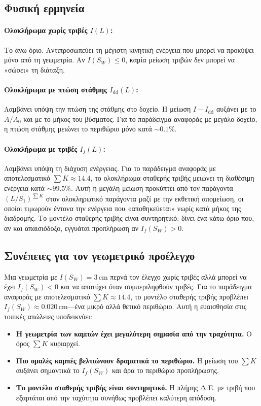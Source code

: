 \documentclass[11pt]{article}
\begin{document}
\subsection{Φυσική ερμηνεία}

\paragraph{Ολοκλήρωμα χωρίς τριβές $I(L)$:} Το άνω όριο. Αντιπροσωπεύει τη μέγιστη κινητική ενέργεια που μπορεί να προκύψει μόνο από τη γεωμετρία. Αν $I(S_W) \leq 0$, καμία μείωση τριβών δεν μπορεί να «σώσει» τη διάταξη.

\paragraph{Ολοκλήρωμα με πτώση στάθμης $I_{\text{dd}}(L)$:} Λαμβάνει υπόψη την πτώση της στάθμης στο δοχείο. Η μείωση $I - I_{\text{dd}}$ αυξάνει με το $A/A_0$ και με το μήκος του βύσματος. Για το παράδειγμα αναφοράς με μεγάλο δοχείο, η πτώση στάθμης μειώνει το περιθώριο μόνο κατά $\sim 0.1\%$.

\paragraph{Ολοκλήρωμα με τριβές $I_f(L)$:} Λαμβάνει υπόψη τη διάχυση ενέργειας. Για το παράδειγμα αναφοράς με αποτελεσματικό $\sum K \approx 14.4$, το ολοκλήρωμα σταθερής τριβής μειώνει τη διαθέσιμη ενέργεια κατά $\sim 99.5\%$. Αυτή η μεγάλη μείωση προκύπτει από τον παράγοντα $(L/S_1)^{\sum K}$ στον ολοκληρωτικό παράγοντα μαζί με την εκθετική απομείωση, οι οποίοι τιμωρούν έντονα την ενέργεια που «αποθηκεύεται» νωρίς κατά μήκος της διαδρομής. Το μοντέλο σταθερής τριβής είναι συντηρητικό: δίνει ένα κάτω όριο που, αν και απαισιόδοξο, εγγυάται προπλήρωση αν $I_f(S_W) > 0$.

\subsection{Συνέπειες για τον γεωμετρικό προέλεγχο}

Μια γεωμετρία με $I(S_W) = 3$\,cm περνά τον έλεγχο χωρίς τριβές αλλά μπορεί να έχει $I_f(S_W) < 0$ και να αποτύχει όταν συμπεριληφθούν τριβές. Για το παράδειγμα αναφοράς με αποτελεσματικό $\sum K \approx 14.4$, το μοντέλο σταθερής τριβής προβλέπει $I_f(S_W) \approx 0.020$\,cm---ένα μικρό αλλά θετικό περιθώριο. Αυτή η ευαισθησία στις τοπικές απώλειες υποδεικνύει:
\begin{itemize}[nosep,leftmargin=2em]
  \item \textbf{Η γεωμετρία των καμπών έχει μεγαλύτερη σημασία από την τραχύτητα.} Ο όρος $\sum K$ κυριαρχεί.
  \item \textbf{Πιο ομαλές καμπές βελτιώνουν δραματικά το περιθώριο.} Η μείωση του $\sum K$ αυξάνει σημαντικά το $I_f(S_W)$ και άρα το περιθώριο προπλήρωσης.
  \item \textbf{Το μοντέλο σταθερής τριβής είναι συντηρητικό.} Η πλήρης Δ.Ε. με τριβή που εξαρτάται από την ταχύτητα συνήθως προβλέπει καλύτερη απόδοση.
\end{itemize}
\end{document}

